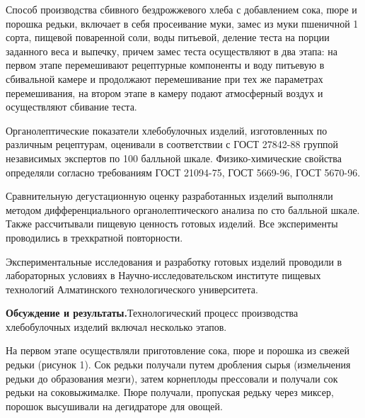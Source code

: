 \begin{multicols}{2}
Способ производства сбивного бездрожжевого хлеба с добавлением сока,
пюре и порошка редьки, включает в себя просеивание муки, замес из муки
пшеничной 1 сорта, пищевой поваренной соли, воды питьевой, деление теста
на порции заданного веса и выпечку, причем замес теста осуществляют в
два этапа: на первом этапе перемешивают рецептурные компоненты и воду
питьевую в сбивальной камере и продолжают перемешивание при тех же
параметрах перемешивания, на втором этапе в камеру подают атмосферный
воздух и осуществляют сбивание теста.

Органолептические показатели хлебобулочных изделий, изготовленных по
различным рецептурам, оценивали в соответствии с ГОСТ 27842-88 группой
независимых экспертов по 100 балльной шкале. Физико-химические свойства
определяли согласно требованиям ГОСТ 21094-75, ГОСТ 5669-96, ГОСТ
5670-96.

Сравнительную дегустационную оценку разработанных изделий выполняли
методом дифференциального органолептического анализа по сто балльной
шкале. Также рассчитывали пищевую ценность готовых изделий. Все
эксперименты проводились в трехкратной повторности.

Экспериментальные исследования и разработку готовых изделий проводили в
лабораторных условиях в Научно-исследовательском институте пищевых
технологий Алматинского технологического университета.

{\bfseries Обсуждение и результаты.}Технологический процесс производства
хлебобулочных изделий включал несколько этапов.

На первом этапе осуществляли приготовление сока, пюре и порошка из
свежей редьки (рисунок 1). Сок редьки получали путем дробления сырья
(измельчения редьки до образования мезги), затем корнеплоды прессовали и
получали сок редьки на соковыжималке. Пюре получали, пропуская редьку
через миксер, порошок высушивали на дегидраторе для овощей.
\end{multicols}

